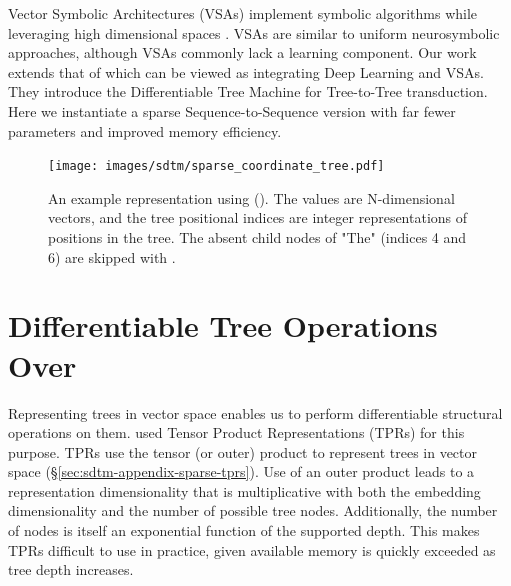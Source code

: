 

Vector Symbolic Architectures (VSAs) implement symbolic algorithms while leveraging high dimensional spaces \citep{plate, gayler2003vsa_jackendoff, kanerva2009hyperdimensional, kleyko2022}. VSAs are similar to uniform neurosymbolic approaches, although VSAs commonly lack a learning component. Our work extends that of \citet{Soulos_2023_DifferentiableTreeOperations} which can be viewed as integrating Deep Learning and VSAs. They introduce the Differentiable Tree Machine for Tree-to-Tree transduction. Here we instantiate a sparse Sequence-to-Sequence version with far fewer parameters and improved memory efficiency.


\begin{figure}
    \centering
    \texttt{[image: images/sdtm/sparse\_coordinate\_tree.pdf]}
    \caption{An example representation using \fullrepname (\abvrepname). The values are N-dimensional vectors, and the tree positional indices are integer representations of positions in the tree. The absent child nodes of "The" (indices 4 and 6) are skipped with \abvrepname.}
    \label{fig:sparse-tpr}
\end{figure}

\section{Differentiable Tree Operations Over \fullrepname}
Representing trees in vector space enables us to perform differentiable structural operations on them. 
\citet{Soulos_2023_DifferentiableTreeOperations} used Tensor Product Representations (TPRs) \citep{Smolensky1990TensorPV} for this purpose. TPRs use the tensor (or outer) product to represent trees in vector space (\S\ref{sec:sdtm-appendix-sparse-tprs}). Use of an outer product leads to a representation dimensionality that is multiplicative with both the embedding dimensionality and the number of possible tree nodes. Additionally, the number of nodes is itself an exponential function of the supported depth. This makes TPRs difficult to use in practice, given available memory is quickly exceeded as tree depth increases.

